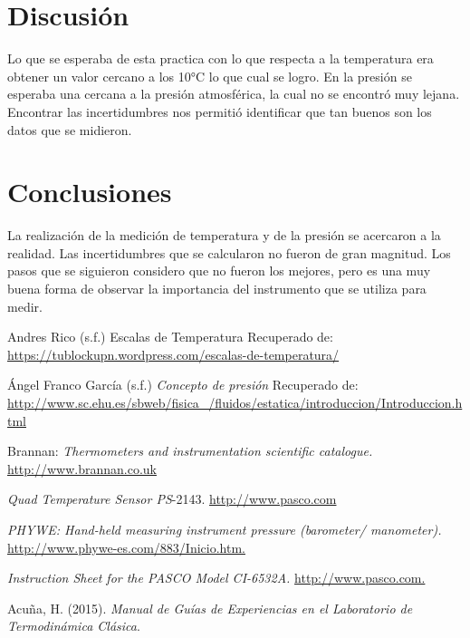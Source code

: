 \documentclass[12pt]{article}
\begin{document}
\section{Discusión}
Lo que se esperaba de esta practica con lo que respecta a la temperatura era obtener un valor cercano a los 10°C lo que cual se logro. En la presión se esperaba una cercana a la presión atmosférica, la cual no se encontró muy lejana. Encontrar las incertidumbres nos permitió identificar que tan buenos son los datos que se midieron.

\section{Conclusiones}
La realización de la medición de temperatura y de la presión se acercaron a la realidad. Las incertidumbres que se calcularon no fueron de gran magnitud. Los pasos que se siguieron considero que no fueron los mejores, pero es una muy buena forma de observar la importancia del instrumento que se utiliza para medir.

\pagebreak
\begin{thebibliography}{6}
	Andres Rico (s.f.) Escalas de Temperatura Recuperado de: \url{ https://tublockupn.wordpress.com/escalas-de-temperatura/}

	Ángel Franco García (s.f.) \textit{Concepto de presión} Recuperado de: \url{http://www.sc.ehu.es/sbweb/fisica_/fluidos/estatica/introduccion/Introduccion.html}
	
	Brannan: \textit{Thermometers and instrumentation scientific catalogue.} \url{http://www.brannan.co.uk}

	\textit{Quad Temperature Sensor PS}-2143.  \url{http://www.pasco.com}

	\textit{PHYWE: Hand-held measuring instrument pressure (barometer/
manometer).} \url{http://www.phywe-es.com/883/Inicio.htm.}

\textit{Instruction Sheet for the PASCO Model CI-6532A.} \url{http://www.pasco.com.}

Acu\~na, H. (2015). \textit{Manual de Guías de Experiencias en el Laboratorio de Termodinámica Clásica}.

\end{thebibliography}
\end{document}
